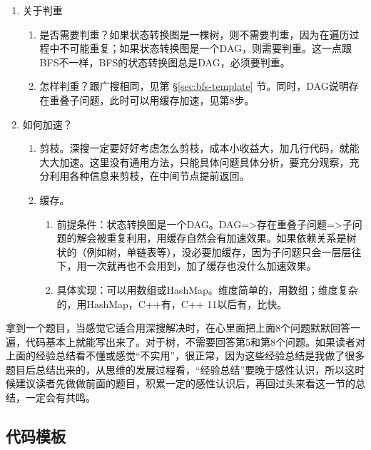 \begin{enumerate}
{为了判断是否到了收敛条件，要在函数接口里用一个参数记录当前的位置（或距离目标还有多远）。如果是求一个解，直接返回这个解；如果是求所有解，要在这里收集解，即把第一步中表示路径的数组复制到解集合里。}

\item 关于判重
    \begin{enumerate}
    \item 是否需要判重？如果状态转换图是一棵树，则不需要判重，因为在遍历过程中不可能重复；如果状态转换图是一个DAG，则需要判重。这一点跟BFS不一样，BFS的状态转换图总是DAG，必须要判重。
    \item 怎样判重？跟广搜相同，见第 \S \ref{sec:bfs-template} 节。同时，DAG说明存在重叠子问题，此时可以用缓存加速，见第8步。
    \end{enumerate}

\item 如何加速？
    \begin{enumerate}
    \item 剪枝。深搜一定要好好考虑怎么剪枝，成本小收益大，加几行代码，就能大大加速。这里没有通用方法，只能具体问题具体分析，要充分观察，充分利用各种信息来剪枝，在中间节点提前返回。
    \item 缓存。
        \begin{enumerate}
            \item 前提条件：状态转换图是一个DAG。DAG=>存在重叠子问题=>子问题的解会被重复利用，用缓存自然会有加速效果。如果依赖关系是树状的（例如树，单链表等），没必要加缓存，因为子问题只会一层层往下，用一次就再也不会用到，加了缓存也没什么加速效果。
            \item 具体实现：可以用数组或HashMap。维度简单的，用数组；维度复杂的，用HashMap，C++有，C++ 11以后有，比快。
        \end{enumerate}
    
    \end{enumerate}
\end{enumerate}

拿到一个题目，当感觉它适合用深搜解决时，在心里面把上面8个问题默默回答一遍，代码基本上就能写出来了。对于树，不需要回答第5和第8个问题。如果读者对上面的经验总结看不懂或感觉“不实用”，很正常，因为这些经验总结是我做了很多题目后总结出来的，从思维的发展过程看，“经验总结”要晚于感性认识，所以这时候建议读者先做做前面的题目，积累一定的感性认识后，再回过头来看这一节的总结，一定会有共鸣。


\subsection{代码模板}

